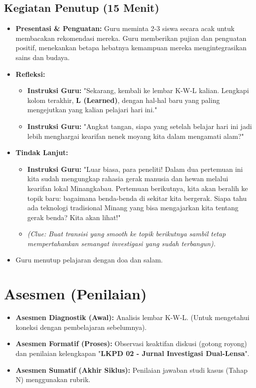 \documentclass[a4paper,12pt]{article}
\begin{document}
\subsection{Kegiatan Penutup (15 Menit)}
\begin{itemize}
\item \textbf{Presentasi \& Penguatan:} Guru meminta 2-3 siswa secara acak untuk membacakan rekomendasi mereka. Guru memberikan pujian dan penguatan positif, menekankan betapa hebatnya kemampuan mereka mengintegrasikan sains dan budaya.
\item \textbf{Refleksi:}
    \begin{itemize}
    \item \textbf{Instruksi Guru:} "Sekarang, kembali ke lembar K-W-L kalian. Lengkapi kolom terakhir, \textbf{L (Learned)}, dengan hal-hal baru yang paling mengejutkan yang kalian pelajari hari ini."
    \item \textbf{Instruksi Guru:} "Angkat tangan, siapa yang setelah belajar hari ini jadi lebih menghargai kearifan nenek moyang kita dalam mengamati alam?"
    \end{itemize}
\item \textbf{Tindak Lanjut:}
    \begin{itemize}
    \item \textbf{Instruksi Guru:} "Luar biasa, para peneliti! Dalam dua pertemuan ini kita sudah mengungkap rahasia gerak manusia dan hewan melalui kearifan lokal Minangkabau. Pertemuan berikutnya, kita akan beralih ke topik baru: bagaimana benda-benda di sekitar kita bergerak. Siapa tahu ada teknologi tradisional Minang yang bisa mengajarkan kita tentang gerak benda? Kita akan lihat!"
    \item \textit{(Clue: Buat transisi yang smooth ke topik berikutnya sambil tetap mempertahankan semangat investigasi yang sudah terbangun).}
    \end{itemize}
\item Guru menutup pelajaran dengan doa dan salam.
\end{itemize}

\section{Asesmen (Penilaian)}

\begin{itemize}
\item \textbf{Asesmen Diagnostik (Awal):} Analisis lembar K-W-L. (Untuk mengetahui koneksi dengan pembelajaran sebelumnya).
\item \textbf{Asesmen Formatif (Proses):} Observasi keaktifan diskusi (gotong royong) dan penilaian kelengkapan "\textbf{LKPD 02 - Jurnal Investigasi Dual-Lensa}".
\item \textbf{Asesmen Sumatif (Akhir Siklus):} Penilaian jawaban studi kasus (Tahap N) menggunakan rubrik.
\end{itemize}
\end{document}
